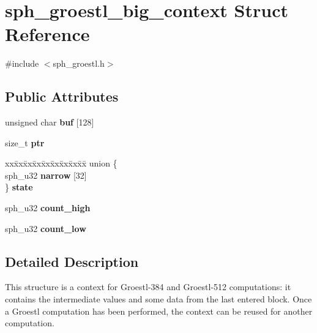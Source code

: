 \hypertarget{structsph__groestl__big__context}{}\section{sph\+\_\+groestl\+\_\+big\+\_\+context Struct Reference}
\label{structsph__groestl__big__context}


{\ttfamily \#include $<$sph\+\_\+groestl.\+h$>$}

\subsection*{Public Attributes}
\begin{DoxyCompactItemize}
\item 
\mbox{\label{structsph__groestl__big__context_af01cbebd23f3939991a330ab266ef32a}} 
unsigned char {\bfseries buf} \mbox{[}128\mbox{]}
\item 
\mbox{\label{structsph__groestl__big__context_a350d7b879c0cd13453089c2f9286b81e}} 
size\+\_\+t {\bfseries ptr}
\item 
\mbox{\label{structsph__groestl__big__context_a9bb3b84248d1805dab36d4951157ac14}} 
\begin{tabbing}
xx\=xx\=xx\=xx\=xx\=xx\=xx\=xx\=xx\=\kill
union \{\\
\>sph\_u32 {\bfseries narrow} \mbox{[}32\mbox{]}\\
\} {\bfseries state}\\

\end{tabbing}\item 
\mbox{\label{structsph__groestl__big__context_a257c12985fd59be228db3df1c681c8b8}} 
sph\+\_\+u32 {\bfseries count\+\_\+high}
\item 
\mbox{\label{structsph__groestl__big__context_afbb1b7f2c1ccf37607aefe70af412155}} 
sph\+\_\+u32 {\bfseries count\+\_\+low}
\end{DoxyCompactItemize}


\subsection{Detailed Description}
This structure is a context for Groestl-\/384 and Groestl-\/512 computations\+: it contains the intermediate values and some data from the last entered block. Once a Groestl computation has been performed, the context can be reused for another computation.

